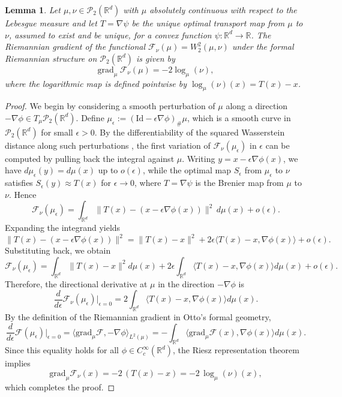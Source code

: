 \documentclass[11pt]{article}
\newtheorem{lemma}[theorem]{Lemma}
\newcommand{\bbR}{\mathbb{R}}
\newcommand{\calF}{\mathcal{F}}
\newcommand{\calP}{\mathcal{P}}
\begin{document}
\begin{lemma}
    Let $\mu,\nu \in \calP_2(\bbR^d)$ with $\mu$ absolutely continuous with respect to the Lebesgue measure and let $T = \nabla \psi$ be the unique optimal transport map from $\mu$ to $\nu$, assumed to exist and be unique, for a convex function $\psi:\bbR^d \to \bbR$. The Riemannian gradient of the functional $\calF_\nu(\mu) = W_2^2(\mu,\nu)$ under the formal Riemannian structure on $\calP_2(\bbR^d)$ is given by 
    \begin{equation}\label{eq:gradient_of_squared_distance}
        \text{grad}_\mu ~\calF_\nu(\mu) = -2\log_\mu(\nu),
    \end{equation}
    where the logarithmic map is defined pointwise by $\log_\mu(\nu)(x) = T(x)-x$.
\end{lemma}
\begin{proof}
We begin by considering a smooth perturbation of $\mu$ along a direction 
$-\nabla \phi \in T_\mu \mathcal P_2(\mathbb R^d)$. Define 
$\mu_\epsilon := (\mathrm{Id}-\epsilon \nabla\phi)_{\#}\mu$, which is a
smooth curve in $\mathcal P_2(\mathbb R^d)$ for small $\epsilon>0$.  
By the differentiability of the squared Wasserstein distance along such
perturbations \citep{ambrosio_2005_GradientFlowsMetric}, the first
variation of $\mathcal F_\nu(\mu_\epsilon)$ in $\epsilon$ can be computed by
pulling back the integral against $\mu$. Writing $y = x - \epsilon \nabla
\phi(x)$, we have $d\mu_\epsilon(y) = d\mu(x)$ up to $o(\epsilon)$, while the
optimal map $S_\epsilon$ from $\mu_\epsilon$ to $\nu$ satisfies
$S_\epsilon(y) \approx T(x)$ for $\epsilon \to 0$, where
$T=\nabla\psi$ is the Brenier map from $\mu$ to $\nu$. Hence
\[
\mathcal F_\nu(\mu_\epsilon) 
  = \int_{\mathbb R^d} \|T(x) - (x - \epsilon \nabla\phi(x))\|^2 \, d\mu(x) + o(\epsilon).
\]
Expanding the integrand yields
\[
\|T(x) - (x - \epsilon \nabla \phi(x))\|^2 
  = \|T(x) - x\|^2 + 2\epsilon \langle T(x)-x, \nabla \phi(x)\rangle + o(\epsilon).
\]
Substituting back, we obtain
\[
\mathcal F_\nu(\mu_\epsilon) 
  = \int_{\mathbb R^d} \|T(x)-x\|^2 d\mu(x) 
    + 2\epsilon \int_{\mathbb R^d} \langle T(x)-x, \nabla\phi(x)\rangle d\mu(x)
    + o(\epsilon).
\]
Therefore, the directional derivative at $\mu$ in the direction $-\nabla \phi$ is
\[
\frac{d}{d\epsilon}\mathcal F_\nu(\mu_\epsilon)\Big|_{\epsilon=0}
   = 2 \int_{\mathbb R^d} \langle T(x)-x, \nabla\phi(x)\rangle d\mu(x).
\]
By the definition of the Riemannian gradient in Otto’s formal geometry,
\[
\frac{d}{d\epsilon}\mathcal F(\mu_\epsilon)\Big|_{\epsilon=0}
  = \langle \mathrm{grad}_\mu \mathcal F, -\nabla\phi \rangle_{L^2(\mu)}
  = - \int_{\mathbb R^d} \langle \mathrm{grad}_\mu \mathcal F(x), \nabla\phi(x)\rangle d\mu(x).
\]
Since this equality holds for all $\phi \in C_c^\infty(\mathbb R^d)$, the
Riesz representation theorem \citep{stein_2011_FunctionalAnalysisIntroduction}
implies
\[
\mathrm{grad}_\mu \mathcal F_\nu(x) = -2\,(T(x)-x) = -2\,\log_\mu(\nu)(x),
\]
which completes the proof.
\end{proof}
\end{document}
